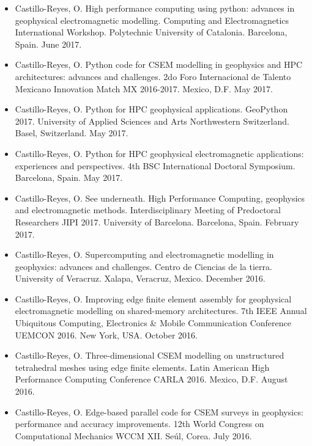 \documentclass[letterpaper,10pt,english]{sphinxmanual}
\begin{document}
\begin{itemize}
\item {} 
Castillo-Reyes, O. High performance computing using python: advances in geophysical electromagnetic modelling. Computing and Electromagnetics International Workshop. Polytechnic University of Catalonia. Barcelona, Spain. June 2017.

\item {} 
Castillo-Reyes, O. Python code for CSEM modelling in geophysics and HPC architectures: advances and challenges. 2do Foro Internacional de Talento Mexicano \textendash{} Innovation Match MX 2016-2017. Mexico, D.F. May 2017.

\item {} 
Castillo-Reyes, O. Python for HPC geophysical applications. GeoPython 2017. University of Applied Sciences and Arts Northwestern Switzerland. Basel, Switzerland. May 2017.

\item {} 
Castillo-Reyes, O. Python for HPC geophysical electromagnetic applications: experiences and perspectives. 4th BSC International Doctoral Symposium. Barcelona, Spain. May 2017.

\item {} 
Castillo-Reyes, O. See underneath. High Performance Computing, geophysics and electromagnetic methods. Interdisciplinary Meeting of Predoctoral Researchers \textendash{} JIPI 2017. University of Barcelona. Barcelona, Spain. February 2017.

\item {} 
Castillo-Reyes, O. Supercomputing and electromagnetic modelling in geophysics: advances and challenges. Centro de Ciencias de la tierra. University of Veracruz. Xalapa, Veracruz, Mexico. December 2016.

\item {} 
Castillo-Reyes, O. Improving edge finite element assembly for geophysical electromagnetic modelling on shared-memory architectures. 7th IEEE Annual Ubiquitous Computing, Electronics \& Mobile Communication Conference \textendash{} UEMCON 2016. New York, USA. October 2016.

\item {} 
Castillo-Reyes, O. Three-dimensional CSEM modelling on unstructured tetrahedral meshes using edge finite elements. Latin American High Performance Computing Conference \textendash{} CARLA 2016.  Mexico, D.F. August 2016.

\item {} 
Castillo-Reyes, O. Edge-based parallel code for CSEM surveys in geophysics: performance and accuracy improvements. 12th World Congress on Computational Mechanics \textendash{} WCCM XII. Seúl, Corea. July 2016.


\end{itemize}
\end{document}
